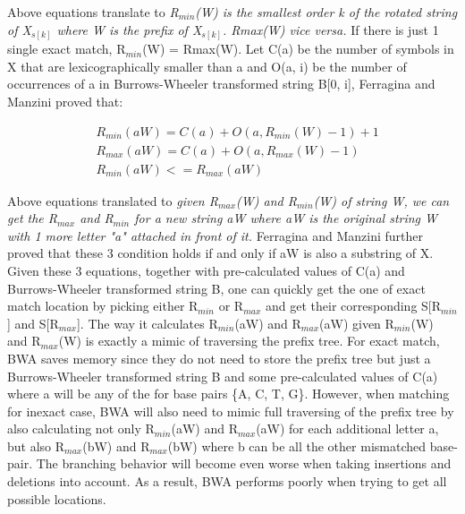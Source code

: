 Above equations translate to \textit{R$_{min}$(W) is the smallest order k of
the rotated string of X$_{s[k]}$ where W is the prefix of X$_{s[k]}$. Rmax(W)
vice versa.} If there is just 1 single exact match, R$_{min}$(W) = Rmax(W). Let
C(a) be the number of symbols in X that are lexicographically smaller than a
and O(a, i) be the number of occurrences of a in Burrows-Wheeler transformed
string B[0, i], Ferragina and Manzini proved that:

\begin{small}
\begin{align*} 
&\mathit{R}_{min}(aW) = C(a) + O(a,R_{min}(W) -1 ) + 1 \\
&\mathit{R}_{max}(aW) = C(a) + O(a,R_{max}(W) -1 ) \\
&\mathit{R}_{min}(aW) <= \mathit{R}_{max}(aW) 
\end{align*}
\end{small}

Above equations translated to \textit{given R$_{max}$(W) and R$_{min}$(W) of
string W, we can get the R$_{max}$ and R$_{min}$ for a new string aW where aW
is the original string W with 1 more letter "a" attached in front of it.}
Ferragina and Manzini further proved that these 3 condition holds if and only
if aW is also a substring of X.  Given these 3 equations, together with
pre-calculated values of C(a) and Burrows-Wheeler transformed string B, one can
quickly get the one of exact match location by picking either R$_{min}$ or
R$_{max}$ and get their corresponding S[R$_{min}$] and S[R$_{max}$]. The way it
calculates R$_{min}$(aW) and R$_{max}$(aW) given R$_{min}$(W) and R$_{max}$(W)
is exactly a mimic of traversing the prefix tree.  For exact match, BWA saves
memory since they do not need to store the prefix tree but just a
Burrows-Wheeler transformed string B and some pre-calculated values of C(a)
where a will be any of the for base pairs \{A, C, T, G\}. However, when
matching for inexact case, BWA will also need to mimic full traversing of the
prefix tree by also calculating not only R$_{min}$(aW) and R$_{max}$(aW) for
each additional letter a, but also R$_{max}$(bW) and R$_{max}$(bW) where b can
be all the other mismatched base-pair. The branching behavior will become even
worse when taking insertions and deletions into account. As a result, BWA
performs poorly when trying to get all possible locations.\\

